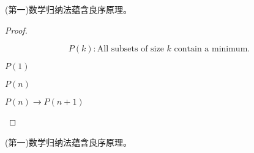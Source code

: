 \begin{frame}{}
  \begin{lemma}
    (第一)数学归纳法蕴含良序原理。
  \end{lemma}

  \pause
  \begin{proof}
    \begin{center}

      \vspace{-0.30cm}
      \[
        P(k): \text{All subsets of size $k$ contain a minimum.}
      \]

      \pause
      \begin{description}
        \item[Basis Step:] $P(1)$
        \item[\textcolor{cyan}{Inductive Hypothesis:}] $P(n)$
        \item[Inductive Step:] $P(n) \to P(n+1)$
      \end{description}

    \end{center}
  \end{proof}
\end{frame}

\begin{frame}{}
  \begin{lemma}
    (第一)数学归纳法蕴含良序原理。
  \end{lemma}

  \begin{center}
  \end{center}
\end{frame}

